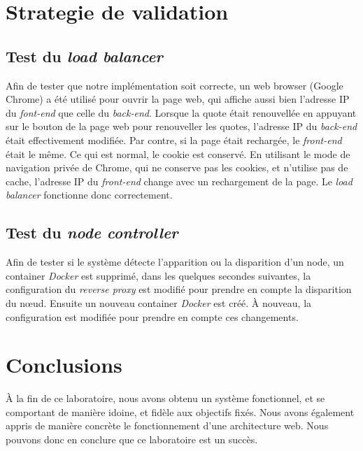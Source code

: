 \documentclass[a4paper,11pt,titlepage]{article}
\begin{document}
\section{Strategie de validation}
\subsection{Test du \emph{load balancer}}
Afin de tester que notre implémentation soit correcte, un web browser (Google Chrome) a été utilisé pour ouvrir la page web,
qui affiche aussi bien l'adresse IP du \emph{font-end} que celle du \emph{back-end}. Lorsque la quote était renouvellée en
appuyant sur le bouton de la page web pour renouveller les quotes, l'adresse IP du \emph{back-end} était effectivement modifiée.
Par contre, si la page était rechargée, le \emph{front-end} était le même. Ce qui est normal, le cookie est conservé. En
utilisant le mode de navigation privée de Chrome, qui ne conserve pas les cookies, et n'utilise pas de cache, l'adresse IP du
\emph{front-end} change avec un rechargement de la page. Le \emph{load balancer} fonctionne donc correctement.

\subsection{Test du \emph{node controller}}
Afin de tester si le système détecte l'apparition ou la disparition d'un node, un container \emph{Docker} est supprimé, dans
les quelques secondes suivantes, la configuration du \emph{reverse proxy} est modifié pour prendre en compte la disparition du
n\oe{}ud. Ensuite un nouveau container \emph{Docker} est créé. À nouveau, la configuration est modifiée pour prendre en compte
ces changements. 

\section{Conclusions}
À la fin de ce laboratoire, nous avons obtenu un système fonctionnel, et se comportant de manière idoine, et fidèle aux
objectifs fixés. Nous avons également appris de manière concrète le fonctionnement d'une architecture web. Nous pouvons
donc en conclure que ce laboratoire est un succès.
\end{document}
